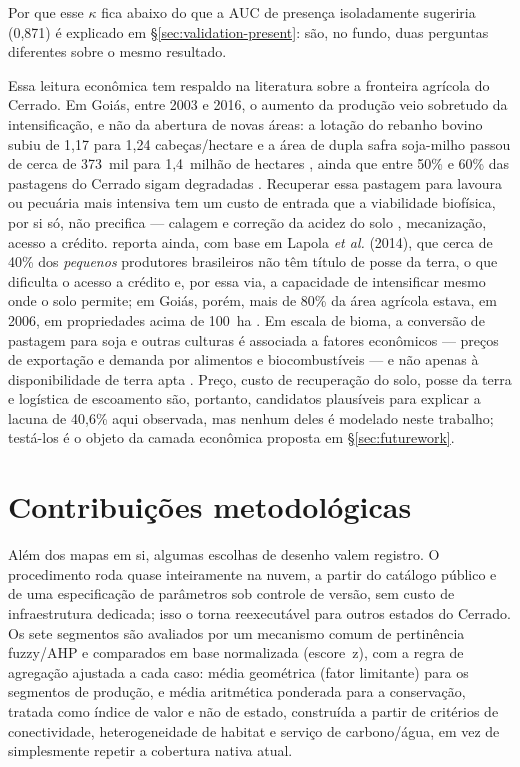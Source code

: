 Por que esse $\kappa$ fica abaixo do que a AUC de presença isoladamente sugeriria (0,871) é
explicado em \S\ref{sec:validation-present}: são, no fundo, duas perguntas diferentes sobre o
mesmo resultado.

Essa leitura econômica tem respaldo na literatura sobre a fronteira agrícola do Cerrado. Em
Goiás, entre 2003 e 2016, o aumento da produção veio sobretudo da intensificação, e não da abertura
de novas áreas: a lotação do rebanho bovino subiu de 1,17 para 1,24 cabeças/hectare e a área de dupla
safra soja-milho passou de cerca de 373~mil para 1,4~milhão de hectares \citep[p.~2]{spera_agricultural_2017},
ainda que entre 50\% e 60\% das pastagens do Cerrado sigam degradadas \citep[p.~4]{spera_agricultural_2017}.
Recuperar essa pastagem para lavoura ou pecuária mais intensiva tem um custo de entrada que a
viabilidade biofísica, por si só, não precifica --- calagem e correção da acidez do solo
\citep[p.~5]{spera_agricultural_2017}, mecanização, acesso a crédito.
\citet[p.~4]{spera_agricultural_2017} reporta ainda, com base em Lapola \emph{et al.} (2014), que cerca de
40\% dos \emph{pequenos} produtores brasileiros não têm título de posse da terra, o que dificulta o
acesso a crédito e, por essa via, a capacidade de intensificar mesmo onde o solo permite; em Goiás,
porém, mais de 80\% da área agrícola estava, em 2006, em propriedades acima de 100~ha
\citep[p.~2]{spera_agricultural_2017}. Em escala de bioma, a conversão de pastagem para soja e
outras culturas é associada a fatores econômicos --- preços de exportação e demanda por alimentos e
biocombustíveis --- e não apenas à disponibilidade de terra apta
\citep[pp.~10, 12]{caballero_transformation_2023}. Preço,
custo de recuperação do solo, posse da terra e logística de escoamento são, portanto, candidatos
plausíveis para explicar a lacuna de 40,6\% aqui observada, mas nenhum deles é modelado neste
trabalho; testá-los é o objeto da camada econômica proposta em \S\ref{sec:futurework}.

\section{Contribuições metodológicas}\label{sec:contributions}

Além dos mapas em si, algumas escolhas de desenho valem registro. O procedimento roda
quase inteiramente na nuvem, a partir do catálogo público e de uma especificação de parâmetros sob
controle de versão, sem custo de infraestrutura dedicada; isso o torna reexecutável para outros
estados do Cerrado. Os sete segmentos são avaliados por um mecanismo comum de pertinência
fuzzy/AHP e comparados em base normalizada (escore~z), com a regra de agregação ajustada a cada
caso: média geométrica (fator limitante) para os segmentos de produção, e média aritmética
ponderada para a conservação, tratada como índice de valor e não de estado, construída a
partir de critérios de conectividade, heterogeneidade de habitat e serviço de carbono/água, em
vez de simplesmente repetir a cobertura nativa atual.

